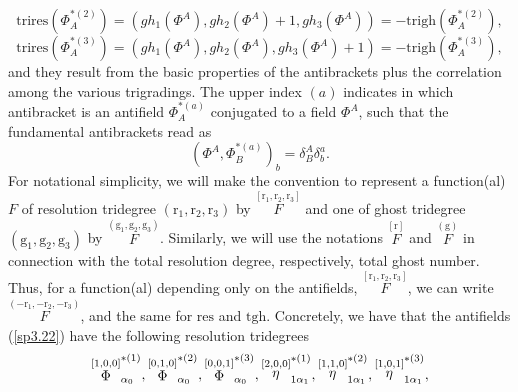 \documentclass[a4paper,12pt]{article}
\begin{document}
\begin{equation}
\mathrm{trires}\left( \Phi _{A}^{*(2)}\right) =\left( gh_{1}\left( \Phi
^{A}\right) ,gh_{2}\left( \Phi ^{A}\right) +1,gh_{3}\left( \Phi ^{A}\right)
\right) =-\mathrm{trigh}\left( \Phi _{A}^{*(2)}\right) ,  \label{sp3.24b}
\end{equation}
\begin{equation}
\mathrm{trires}\left( \Phi _{A}^{*(3)}\right) =\left( gh_{1}\left( \Phi
^{A}\right) ,gh_{2}\left( \Phi ^{A}\right) ,gh_{3}\left( \Phi ^{A}\right)
+1\right) =-\mathrm{trigh}\left( \Phi _{A}^{*(3)}\right) ,  \label{sp3.24c}
\end{equation}
and they result from the basic properties of the antibrackets plus the
correlation among the various trigradings. The upper index $(a)$ indicates
in which antibracket is an antifield $\Phi _{A}^{*(a)}$ conjugated to a
field $\Phi ^{A}$, such that the fundamental antibrackets read as 
\begin{equation}
\left( \Phi ^{A},\Phi _{B}^{*(a)}\right) _{b}=\delta _{B}^{A}\delta _{b}^{a}.
\label{sp3.25}
\end{equation}
For notational simplicity, we will make the convention to represent a
function(al) $F$ of resolution tridegree $\left( \mathrm{r}_{1},\mathrm{r}%
_{2},\mathrm{r}_{3}\right) $ by $\stackrel{\left[ \mathrm{r}_{1},\mathrm{r}%
_{2},\mathrm{r}_{3}\right] }{F}$ and one of ghost tridegree $\left( \mathrm{g%
}_{1},\mathrm{g}_{2},\mathrm{g}_{3}\right) $ by $\stackrel{\left( \mathrm{g}%
_{1},\mathrm{g}_{2},\mathrm{g}_{3}\right) }{F}$. Similarly, we will use the
notations $\stackrel{\left[ \mathrm{r}\right] }{F}$ and $\stackrel{\left( 
\mathrm{g}\right) }{F}$ in connection with the total resolution degree,
respectively, total ghost number. Thus, for a function(al) depending only on
the antifields, $\stackrel{\left[ \mathrm{r}_{1},\mathrm{r}_{2},\mathrm{r}%
_{3}\right] }{F}$, we can write $\stackrel{\left( -\mathrm{r}_{1},-\mathrm{r}%
_{2},-\mathrm{r}_{3}\right) }{F}$, and the same for $\mathrm{res}$ and $%
\mathrm{tgh}$. Concretely, we have that the antifields (\ref{sp3.22}) have
the following resolution tridegrees 
\begin{equation}
\stackrel{\left[ 1,0,0\right] }{\Phi }_{\alpha _{0}}^{*(1)},\stackrel{\left[
0,1,0\right] }{\Phi }_{\alpha _{0}}^{*(2)},\stackrel{\left[ 0,0,1\right] }{%
\Phi }_{\alpha _{0}}^{*(3)},\stackrel{\left[ 2,0,0\right] }{\eta }_{1\alpha
_{1}}^{*(1)},\stackrel{\left[ 1,1,0\right] }{\eta }_{1\alpha _{1}}^{*(2)},%
\stackrel{\left[ 1,0,1\right] }{\eta }_{1\alpha _{1}}^{*(3)},  \label{sp3.26}
\end{equation}
\end{document}
